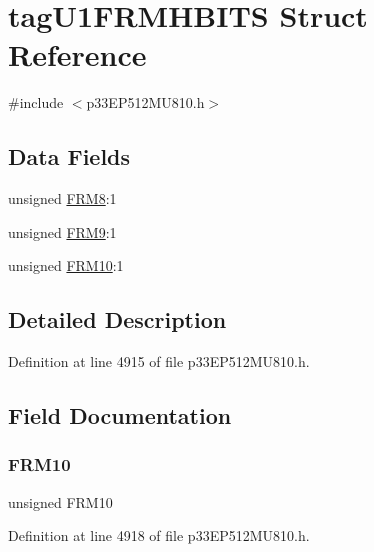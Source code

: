 \hypertarget{structtag_u1_f_r_m_h_b_i_t_s}{}\section{tag\+U1\+F\+R\+M\+H\+B\+I\+TS Struct Reference}
\label{structtag_u1_f_r_m_h_b_i_t_s}


{\ttfamily \#include $<$p33\+E\+P512\+M\+U810.\+h$>$}

\subsection*{Data Fields}
\begin{DoxyCompactItemize}
\item 
unsigned \hyperlink{structtag_u1_f_r_m_h_b_i_t_s_abcba4019e244c770bcf9d4f1005d6af3}{F\+R\+M8}\+:1
\item 
unsigned \hyperlink{structtag_u1_f_r_m_h_b_i_t_s_adc22dcac5b6f99eedca6d66d1b848343}{F\+R\+M9}\+:1
\item 
unsigned \hyperlink{structtag_u1_f_r_m_h_b_i_t_s_a2061d0fd64616a8728a2ed32dd7da8c1}{F\+R\+M10}\+:1
\end{DoxyCompactItemize}


\subsection{Detailed Description}


Definition at line 4915 of file p33\+E\+P512\+M\+U810.\+h.



\subsection{Field Documentation}
\mbox{\label{structtag_u1_f_r_m_h_b_i_t_s_a2061d0fd64616a8728a2ed32dd7da8c1}} 
\subsubsection{\texorpdfstring{F\+R\+M10}{FRM10}}
{\footnotesize\ttfamily unsigned F\+R\+M10}



Definition at line 4918 of file p33\+E\+P512\+M\+U810.\+h.

